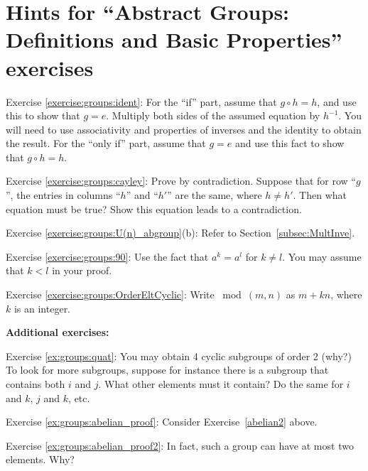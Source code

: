 \section{Hints for ``Abstract Groups: Definitions and Basic Properties'' exercises}\label{sec:groups:hints}

\noindent Exercise \ref{exercise:groups:ident}: For the ``if'' part, assume that $g \circ h = h$, and use this to show that $g = e$. Multiply both sides of the assumed equation by $h^{-1}$. You will need to use associativity and properties of inverses and the identity to obtain the result.  For the ``only if'' part, assume that $g=e$ and use this fact to show that $g \circ h = h$.

\noindent Exercise \ref{exercise:groups:cayley}: Prove by contradiction. Suppose that for row ``$g$'', the entries in columns ``$h$'' and ``$h'$'' are the same, where $h \neq h'$.  Then what equation must be true? Show this equation leads to a contradiction.

\noindent Exercise \ref{exercise:groups:U(n)_abgroup}(b): Refer to Section~\ref{subsec:MultInve}.

\noindent Exercise \ref{exercise:groups:90}: Use the fact that $a^k = a^l$ for $k \neq l$.  You may assume that $k < l$ in your proof.

\noindent Exercise \ref{exercise:groups:OrderEltCyclic}: Write $\bmod(m,n)$ as $m + kn$, where $k$ is an integer.

\bigskip

\textbf{Additional exercises:}

\noindent Exercise \ref{ex:groups:quat}: You may obtain 4 cyclic subgroups of order 2 (why?)  To look for more subgroups, suppose for instance there is a subgroup that contains both $i$ and $j$.  What other elements must it contain?  Do the same for $i$ and $k$, $j$ and $k$, etc.

\noindent Exercise \ref{ex:groups:abelian_proof}: Consider Exercise~\ref{abelian2} above.

\noindent Exercise \ref{ex:groups:abelian_proof2}: In fact, such a group can have at most two elements.  Why?

